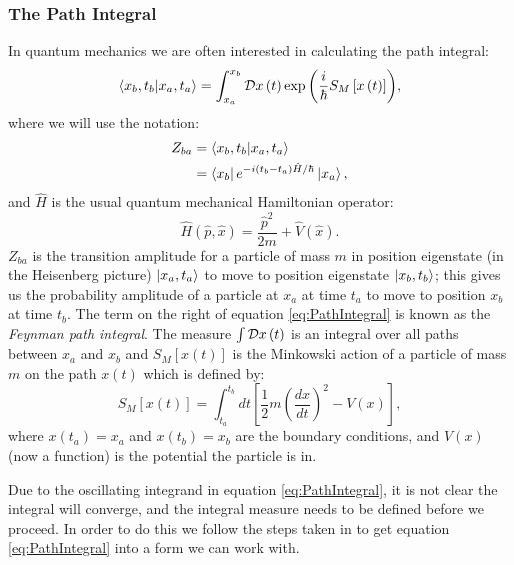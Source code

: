 \documentclass[12pt]{article}
\begin{document}
        \subsubsection{The Path Integral}
        \label{sec:QuantumMechanics}
        In quantum mechanics we are often interested in calculating the path integral:
        \begin{equation}
            \label{eq:PathIntegral}
            \braket{x_b,t_b|x_a,t_a} = \int_{x_a}^{x_b} {\cal D} x\left(t\right) \exp{\left(\frac{i}{\hbar} S_M\left[x\left(t\right)\right]\right)},
        \end{equation}
        where we will use the notation:
        \begin{align}
            \label{eq:PathIntegralZ_fi}
            Z_{ba} & = \braket{x_b,t_b|x_a,t_a} \\
            \label{eq:PathIntegralZ_fi2}
                   & = \bra{x_b}e^{-i\left(t_b-t_a\right)\hat{H}/\hbar}\ket{x_a},
        \end{align}
        and $\hat{H}$ is the usual quantum mechanical Hamiltonian operator:
        \begin{equation}
            \hat{H}\left(\hat{p},\hat{x}\right) = \frac{\hat{p}^2}{2m} + \hat{V}\left(\hat{x}\right).
        \end{equation} 
        $Z_{ba}$ is the transition amplitude for a particle of mass $m$ in position eigenstate (in the Heisenberg picture) $\ket{x_a,t_a}$ to move to position eigenstate $\ket{x_b,t_b}$; this gives us the probability amplitude of a particle at $x_a$ at time $t_a$ to move to position $x_b$ at time $t_b$. The term on the right of equation \ref{eq:PathIntegral} is known as the \textit{Feynman path integral}. The measure $\int {\cal D} x\left(t\right)$ is an integral over all paths between $x_a$ and $x_b$ and $S_M\left[x\left(t\right)\right]$ is the Minkowski action of a particle of mass $m$ on the path $x\left(t\right)$ which is defined by:
        \begin{equation}
            \label{eq:MinkowskiAction}
            S_M\left[x\left(t\right)\right] = \int_{t_a}^{t_b} dt \left[\frac{1}{2}m\left(\frac{dx}{dt}\right)^2 - V(x)\right],
        \end{equation}
        where $x\left(t_a\right) = x_a$ and $x\left(t_b\right) = x_b$ are the boundary conditions, and $V\left(x\right)$ (now a function) is the potential the particle is in.

        Due to the oscillating integrand in equation \ref{eq:PathIntegral}, it is not clear the integral will converge, and the integral measure needs to be defined before we proceed. In order to do this we follow the steps taken in \cite{creutz_freedman_1981} to get equation \ref{eq:PathIntegral} into a form we can work with.
\end{document}
